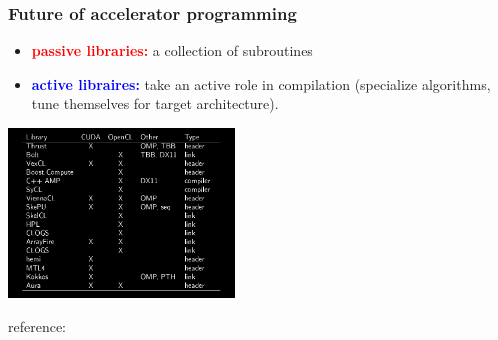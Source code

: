 \begin{frame}
  \frametitle{Future of accelerator programming}

  \begin{itemize}
  \item \textcolor{red}{\textbf{passive libraries:}} a collection of subroutines
  \item \textcolor{blue}{\textbf{active libraires:}} take an active role in compilation (specialize algorithms, tune themselves for target architecture).
  \end{itemize}

  \begin{center}
    \includegraphics[width=6cm]{images/acc_prog_cpp.pdf}
  \end{center}
  
  reference: 
  
\end{frame}


    
